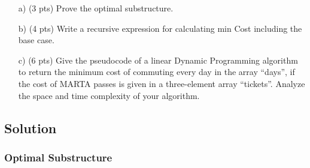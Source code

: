 \documentclass{article}
\begin{document}
\begin{itemize}
\item[a)] (3 pts) Prove the optimal substructure.
\item[b)] (4 pts) Write a recursive expression for calculating min Cost including the base case.
\item[c)] (6 pts) Give the pseudocode of  a   linear   Dynamic   Programming   algorithm   to   return   the   minimum   cost   of commuting  every day in the array “days”, if the cost of MARTA passes is given in a three-element array “tickets”.	Analyze the space and time complexity of your algorithm.
\end{itemize}
\color{blue}
\subsection*{Solution}

\subsubsection*{Optimal Substructure}
\end{document}
